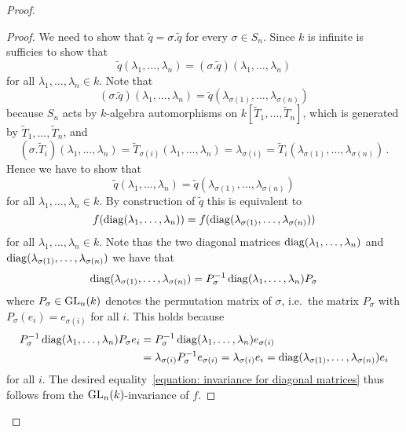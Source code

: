\begin{proof}
  \begin{proof}
    We need to show that $\tilde{q} = \sigma.\tilde{q}$ for every $\sigma \in S_n$.
    Since $k$ is infinite is sufficies to show that
    \[
        \tilde{q}(\lambda_1, \dotsc, \lambda_n)
      = (\sigma.\tilde{q})(\lambda_1, \dotsc, \lambda_n)
    \]
    for all $\lambda_1, \dotsc, \lambda_n \in k$.
    Note that
    \[
        (\sigma.\tilde{q})(\lambda_1, \dotsc, \lambda_n)
      = \tilde{q}(\lambda_{\sigma(1)}, \dotsc, \lambda_{\sigma(n)})
    \]
    because $S_n$ acts by $k$-algebra automorphisms on $k[\tilde{T}_1, \dotsc, \tilde{T}_n]$, which is generated by $\tilde{T}_1, \dotsc, \tilde{T}_n$, and
    \[
        (\sigma.\tilde{T}_i)(\lambda_1, \dotsc, \lambda_n)
      = \tilde{T}_{\sigma(i)}(\lambda_1, \dotsc, \lambda_n)
      = \lambda_{\sigma(i)}
      = \tilde{T}_i(\lambda_{\sigma(1)}, \dotsc, \lambda_{\sigma(n)}) \,.
    \]
    Hence we have to show that
    \[
        \tilde{q}(\lambda_1, \dotsc, \lambda_n)
      = \tilde{q}(\lambda_{\sigma(1)}, \dotsc, \lambda_{\sigma(n)})
    \]
    for all $\lambda_1, \dotsc, \lambda_n \in k$.
    By construction of $\tilde{q}$ this is equivalent to
    \begin{equation}
    \label{equation: invariance for diagonal matrices}
        f(\operatorname{diag}(\lambda_1, \dotsc, \lambda_n))
      = f(\operatorname{diag}(\lambda_{\sigma(1)}, \dotsc, \lambda_{\sigma(n)}))
    \end{equation}
    for all $\lambda_1, \dotsc, \lambda_n \in k$.
    Note thas the two diagonal matrices $\operatorname{diag}(\lambda_1, \dotsc, \lambda_n)$ and $\operatorname{diag}(\lambda_{\sigma(1)}, \dotsc, \lambda_{\sigma(n)})$ we have that
    \[
        \operatorname{diag}(\lambda_{\sigma(1)}, \dotsc, \lambda_{\sigma(n)})
      = P_\sigma^{-1} \operatorname{diag}(\lambda_1, \dotsc, \lambda_n) P_\sigma
    \]
    where $P_\sigma \in \operatorname{GL}_n(k)$ denotes the permutation matrix of $\sigma$, i.e.\ the matrix $P_\sigma$ with $P_\sigma(e_i) = e_{\sigma(i)}$ for all $i$.
    This holds because
    \begin{align*}
          P_\sigma^{-1} \operatorname{diag}(\lambda_1, \dotsc, \lambda_n) P_\sigma e_i
      &=  P_\sigma^{-1} \operatorname{diag}(\lambda_1, \dotsc, \lambda_n) e_{\sigma(i)}  \\
      &=  \lambda_{\sigma(i)} P_\sigma^{-1} e_{\sigma(i)}
       =  \lambda_{\sigma(i)} e_i
       =  \operatorname{diag}(\lambda_{\sigma(1)}, \dotsc, \lambda_{\sigma(n)}) e_i
    \end{align*}
    for all $i$.
    The desired equality~\eqref{equation: invariance for diagonal matrices} thus follows from the $\operatorname{GL}_n(k)$-invariance of $f$.
  \end{proof}
  

\end{proof}
